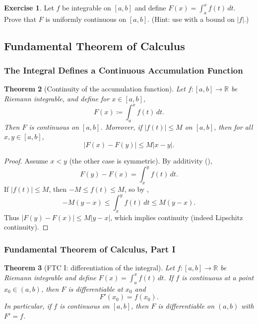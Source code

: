 \documentclass[12pt]{article}
\numberwithin{equation}{section}
\def\abs#1{|#1|}
\def\diff{d}
\newcommand{\RR}{\mathbb{R}}
\DeclarePairedDelimiter{\abs}{\lvert}{\rvert}
\newcommand{\diff}{\mathop{}\!\mathrm{d}}    %
\theoremstyle{plain}
\newtheorem{theorem}{Theorem}[section]
\theoremstyle{definition}
\newtheorem{exercise}[theorem]{Exercise}
\theoremstyle{remark}
\begin{document}
\begin{exercise}
Let $f$ be integrable on $[a,b]$ and define $F(x)=\int_a^x f(t)\,\diff t$.
Prove that $F$ is uniformly continuous on $[a,b]$.
(Hint: use  with a bound on $\abs{f}$.)
\end{exercise}

\newpage

\subsection{Fundamental Theorem of Calculus}

\subsubsection{The Integral Defines a Continuous Accumulation Function}

\begin{theorem}[Continuity of the accumulation function]\label{thm:accum-cont}
Let $f:[a,b]\to\RR$ be Riemann integrable, and define for $x\in[a,b]$,
\[
F(x)\coloneqq \int_a^x f(t)\,\diff t.
\]
Then $F$ is continuous on $[a,b]$.
Moreover, if $\abs{f(t)}\le M$ on $[a,b]$, then for all $x,y\in[a,b]$,
\[
\abs{F(x)-F(y)}\le M\abs{x-y}.
\]
\end{theorem}

\begin{proof}
Assume $x<y$ (the other case is symmetric).
By additivity (),
\[
F(y)-F(x)=\int_x^y f(t)\,\diff t.
\]
If $\abs{f(t)}\le M$, then $-M\le f(t)\le M$, so by ,
\[
-M(y-x)\le \int_x^y f(t)\,\diff t \le M(y-x).
\]
Thus $\abs{F(y)-F(x)}\le M\abs{y-x}$, which implies continuity (indeed Lipschitz continuity).
\end{proof}

\subsubsection{Fundamental Theorem of Calculus, Part I}

\begin{theorem}[FTC I: differentiation of the integral]\label{thm:ftc1}
Let $f:[a,b]\to\RR$ be Riemann integrable and define $F(x)=\int_a^x f(t)\,\diff t$.
If $f$ is continuous at a point $x_0\in(a,b)$, then $F$ is differentiable at $x_0$ and
\[
F'(x_0)=f(x_0).
\]
In particular, if $f$ is continuous on $[a,b]$, then $F$ is differentiable on $(a,b)$ with $F'=f$.
\end{theorem}
\end{document}
